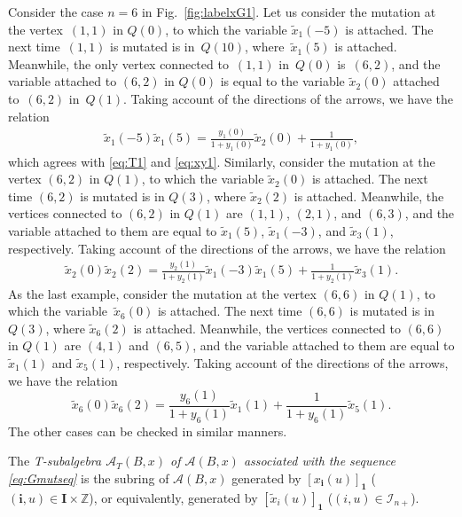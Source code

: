 \begin{Example}
Consider the case $n=6$ in Fig.~\ref{fig:labelxG1}.
Let us consider the mutation at the vertex~$(1,1)$ in $Q(0)$,
to which  the variable $\tilde{x}_1(-5)$ is attached.
The next time~$(1,1)$ is mutated is in~$Q(10)$,
where~$\tilde{x}_1(5)$ is attached.
Meanwhile, the only vertex connected to~$(1,1)$ in~$Q(0)$ is~$(6,2)$,
and the  variable attached to $(6,2)$ in $Q(0)$ is equal to
the variable  $\tilde{x}_2(0)$ attached to~$(6,2)$ in~$Q(1)$.
Taking account of the directions of the arrows,
we have the  relation
\begin{align*}
\tilde{x}_1(-5)\tilde{x}_1(5)=
\frac{y_1(0)}{1+y_1(0)} \tilde{x}_2(0)
+ \frac{1}{1+y_1(0)} ,
\end{align*}
which agrees with
\eqref{eq:T1} and
\eqref{eq:xy1}.
Similarly, consider the mutation at the vertex $(6,2)$ in $Q(1)$,
to which  the variable $\tilde{x}_2(0)$ is attached.
The next time $(6,2)$ is mutated is in $Q(3)$,
where $\tilde{x}_2(2)$ is attached.
Meanwhile, the vertices connected to $(6,2)$ in $Q(1)$
are $(1,1)$, $(2,1)$, and $(6,3)$,
and the  variable attached to them are equal to
$\tilde{x}_1(5)$, $\tilde{x}_1(-3)$, and $\tilde{x}_3(1)$, respectively.
Taking account of the directions of the arrows,
we have the relation
\begin{align*}
\tilde{x}_2(0)\tilde{x}_2(2)=
\frac{y_2(1)}{1+y_2(1)} \tilde{x}_1(-3)\tilde{x}_1(5)
+ \frac{1}{1+y_2(1)} \tilde{x}_3(1).
\end{align*}
As the last example,
consider the mutation at the vertex $(6,6)$ in $Q(1)$,
to which  the va\-riab\-le~$\tilde{x}_6(0)$ is attached.
The next time $(6,6)$ is mutated is in $Q(3)$,
where $\tilde{x}_6(2)$ is attached.
Meanwhile, the vertices connected to $(6,6)$ in $Q(1)$
are $(4,1)$ and $(6,5)$,
and the  variable attached to them are equal to
$\tilde{x}_1(1)$ and  $\tilde{x}_5(1)$, respectively.
Taking account of the directions of the arrows,
we have the relation
\[
\tilde{x}_6(0)\tilde{x}_6(2)=
\frac{y_6(1)}{1+y_6(1)} \tilde{x}_1(1)
+ \frac{1}{1+y_6(1)} \tilde{x}_5(1).
\]
The other cases can be checked in similar manners.
\end{Example}

\begin{Definition}
\label{def:T-sub}
The {\em T-subalgebra
$\mathcal{A}_T(B,x)$
of ${\mathcal{A}}(B,x)$
associated with the sequence \eqref{eq:Gmutseq}}
is the subring of
${\mathcal{A}}(B,x)$
generated by
$[x_{\mathbf{i}}(u)]_{\mathbf{1}}$
($(\mathbf{i},u)\in \mathbf{I}\times \mathbb{Z}$),
or equivalently,
generated by
$[\tilde{x}_{i}(u)]_{\mathbf{1}}$
($(i,u)\in \mathcal{I}_{n+}$).
\end{Definition}

